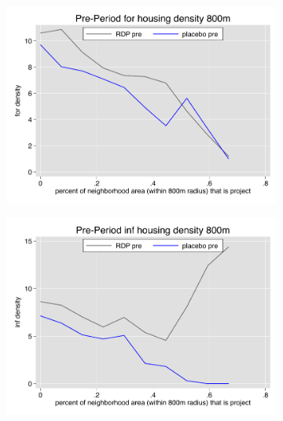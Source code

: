 \documentclass[12pt]{article}
\begin{document}
\pagebreak




\begin{figure}
        \begin{subfigure}[b]{0.495\textwidth}
            \centering
            \includegraphics[width=\textwidth,trim={0.3cm .3cm 0.1cm 0cm}, clip=true]{figures/overlap_for_800_local_pre.pdf}
        \end{subfigure}
        \hfill
        \begin{subfigure}[b]{0.495\textwidth}  
            \centering 
            \includegraphics[width=\textwidth,trim={0.3cm .3cm 0.1cm 0cm}, clip=true]{figures/overlap_inf_800_local_pre.pdf}
        \end{subfigure}

\end{figure}
\end{document}
